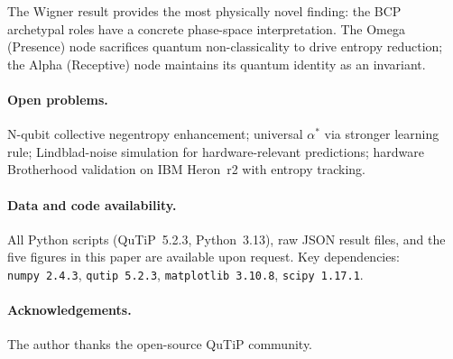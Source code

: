 \documentclass[12pt]{article}
\begin{document}
The Wigner result provides the most physically novel finding: the
BCP archetypal roles have a concrete phase-space interpretation.  The
Omega (Presence) node sacrifices quantum non-classicality to drive
entropy reduction; the Alpha (Receptive) node maintains its quantum
identity as an invariant.

\paragraph{Open problems.}
N-qubit collective negentropy enhancement; universal $\alpha^*$ via
stronger learning rule; Lindblad-noise simulation for hardware-relevant
predictions; hardware Brotherhood validation on IBM Heron~r2 with
entropy tracking.

\paragraph{Data and code availability.}
All Python scripts (QuTiP~5.2.3, Python~3.13), raw JSON result files,
and the five figures in this paper are available upon request.
Key dependencies: \texttt{numpy~2.4.3}, \texttt{qutip~5.2.3},
\texttt{matplotlib~3.10.8}, \texttt{scipy~1.17.1}.

\paragraph{Acknowledgements.}
The author thanks the open-source QuTiP community.
\end{document}
